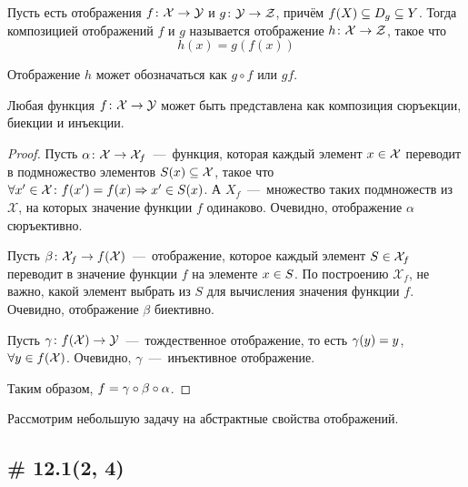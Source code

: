 \documentclass[a4paper,12pt]{article}
\begin{document}
  \begin{definition}
    Пусть есть отображения $f\colon \mathcal X \hm\to \mathcal Y$ и $g\colon \mathcal Y \hm\to \mathcal Z$, причём $f(X) \hm\subseteq D_g \hm\subseteq Y$.  %
    Тогда композицией отображений $f$ и $g$ называется отображение $h\colon \mathcal X \hm\to \mathcal Z$, такое что  %
    \[
      h(x) = g(f(x))
    \]
    
    Отображение $h$ может обозначаться как $g\circ f$ или $gf$.
  \end{definition}

  \begin{theorem}
    Любая функция $f\colon \mathcal X \hm\to \mathcal Y$ может быть представлена как композиция сюръекции, биекции и инъекции.
  \end{theorem}
  
  \begin{proof}
    Пусть $\alpha\colon \mathcal X \hm\to \mathcal X_f$~---~функция, которая каждый элемент $x \hm\in \mathcal X$ переводит в подмножество элементов $S(x) \hm\subseteq \mathcal X$, такое что $\forall x' \hm\in \mathcal X\colon f(x') \hm= f(x) \hm\Rightarrow x' \hm\in S(x)$.
    А $X_f$~---~множество таких подмножеств из $\mathcal X$, на которых значение функции $f$ одинаково.
    Очевидно, отображение $\alpha$ сюръективно.
    
    Пусть $\beta\colon \mathcal X_f \hm\to f(\mathcal X)$~---~отображение, которое каждый элемент $S \hm\in \mathcal X_f$ переводит в значение функции $f$ на элементе $x \hm\in S$.
    По построению $\mathcal X_f$, не важно, какой элемент выбрать из $S$ для вычисления значения функции $f$.
    Очевидно, отображение $\beta$ биективно.
    
    Пусть $\gamma\colon f(\mathcal X) \hm\to \mathcal Y$~---~тождественное отображение, то есть $\gamma(y) \hm= y$, $\forall y \hm\in f(\mathcal X)$.
    Очевидно, $\gamma$~---~инъективное отображение.
    
    Таким образом, $f \hm= \gamma \circ \beta \circ \alpha$.
  \end{proof}
  
  Рассмотрим небольшую задачу на абстрактные свойства отображений.
  
  \subsection{\# 12.1(2, 4)}
  
\end{document}
